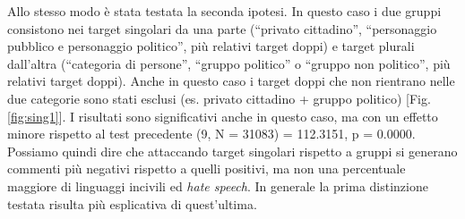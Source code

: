 %

Allo stesso modo è stata testata la seconda ipotesi. In questo caso i due gruppi consistono nei target singolari da una parte (“privato cittadino”, “personaggio pubblico e personaggio politico”, più relativi target doppi) e target plurali dall'altra (“categoria di persone”, “gruppo politico” o “gruppo non politico”, più relativi target doppi). Anche in questo caso i target doppi che non rientrano nelle due categorie sono stati esclusi (es. privato cittadino + gruppo politico) [Fig.\ref{fig:sing1}]. I risultati sono significativi anche in questo caso, ma con un effetto minore rispetto al test precedente (9, N = 31083) = 112.3151, p = 0.0000. Possiamo quindi dire che attaccando target singolari rispetto a gruppi si generano commenti più negativi rispetto a quelli positivi, ma non una percentuale maggiore di linguaggi incivili ed \textit{hate speech}. In generale la prima distinzione testata risulta più esplicativa di quest'ultima.



